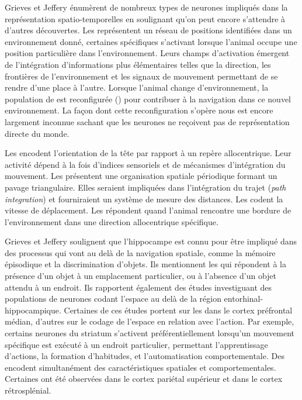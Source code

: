 Grieves et Jeffery énumèrent de nombreux types de neurones impliqués dans la représentation spatio-temporelles en soulignant qu'on peut encore s'attendre à d'autres découvertes.
Les  représentent un réseau de positions identifiées dans un environnement donné, certaines  spécifiques s’activant lorsque l’animal occupe une position particulière dans l'environnement. 
Leurs champs d’activation émergent de l’intégration d’informations plus élémentaires telles que la direction, les frontières de l’environnement et les signaux de mouvement permettant de se rendre d'une place à l'autre. 
Lorsque l'animal change d'environnement, la population de  est reconfigurée () pour contribuer à la navigation dans ce nouvel environnement.
La façon dont cette reconfiguration s'opère nous est encore largement inconnue sachant que les neurones ne reçoivent pas de représentation directe du monde. 

Les  encodent l’orientation de la tête par rapport à un repère allocentrique. 
Leur activité dépend à la fois d’indices sensoriels et de mécanismes d’intégration du mouvement. 
Les  présentent une organisation spatiale périodique formant un pavage triangulaire. 
Elles seraient impliquées dans l’intégration du trajet (\emph{path integration}) et fourniraient un système de mesure des distances.
Les  codent la vitesse de déplacement.
Les  répondent quand l'animal rencontre une bordure de l'environnement dans une direction allocentrique spécifique. 

Grieves et Jeffery soulignent que l'hippocampe est connu pour être impliqué dans des processus qui vont au delà de la navigation spatiale, comme la mémoire épisodique et la discrimination d'objets. 
Ils mentionnent les  qui répondent à la présence d'un objet à un emplacement particulier, ou à l'absence d'un objet attendu à un endroit. 
Ils rapportent également des études investiguant des populations de neurones codant l'espace au delà de la région entorhinal-hippocampique. Certaines de ces études portent sur les  dans le cortex préfrontal médian, 
d'autres sur le codage de l’espace en relation avec l’action. 
Par exemple, certains neurones du striatum s’activent préférentiellement lorsqu'un mouvement spécifique est exécuté à un endroit particulier, permettant l’apprentissage d’actions, la formation d’habitudes, et l’automatisation comportementale.
Des  encodent simultanément des caractéristiques spatiales et comportementales. 
Certaines ont été observées dans le cortex pariétal supérieur et dans le cortex rétrosplénial.


